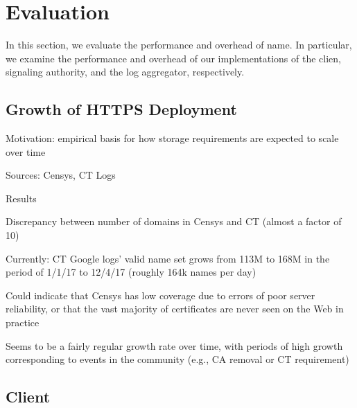 \section{Evaluation}
\label{sec:evaluation}

In this section, we evaluate the performance and overhead of \ac{name}. In
particular, we examine the performance and overhead of our implementations of
the clien, signaling authority, and the log aggregator, respectively.

\subsection{Growth of HTTPS Deployment}

\begin{compactitem}
\item Motivation: empirical basis for how storage requirements are expected to
  scale over time
\item Sources: Censys, CT Logs
\item Results
  \begin{compactitem}
  \item Discrepancy between number of domains in Censys and CT (almost a factor
    of 10)
    \begin{compactitem}
    \item Currently: CT Google logs' valid name set grows from 113M to 168M in
      the period of 1/1/17 to 12/4/17 (roughly 164k names per day)
    \item Could indicate that Censys has low coverage due to errors of poor
      server reliability, or that the vast majority of certificates are never
      seen on the Web in practice
    \end{compactitem}
  \item Seems to be a fairly regular growth rate over time, with periods of high
    growth corresponding to events in the community (e.g., CA removal or CT
    requirement)
  \item {}
  \item {}
  \item {}
  \end{compactitem}
\end{compactitem}

\subsection{Client}\label{sec:eval:client}

